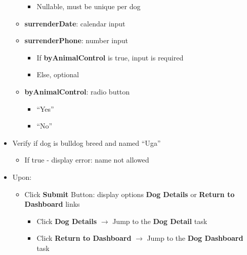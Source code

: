 \documentclass{article}
\begin{document}
\begin{itemize}
\begin{itemize}
\begin{itemize}
            \item Nullable, must be unique per dog
        \end{itemize}
        \item \textbf{surrenderDate}: calendar input
        \item \textbf{surrenderPhone}: number input
        \begin{itemize}
            \item If \textbf{byAnimalControl} is true, input is required
            \item Else, optional
        \end{itemize}
        \item \textbf{byAnimalControl}: radio button
        \begin{itemize}
            \item ``Yes''
            \item ``No''
        \end{itemize}
    \end{itemize}
    \item Verify if dog is bulldog breed and named ``Uga''
    \begin{itemize}
        \item If true - display error: name not allowed
    \end{itemize}
    \item Upon:
    \begin{itemize}
        \item Click \textbf{Submit} Button: display options \textbf{Dog Details} or \textbf{Return to Dashboard} links
        \begin{itemize}
            \item Click \textbf{Dog Details} $\rightarrow$ Jump to the \textbf{Dog Detail} task
            \item Click \textbf{Return to Dashboard} $\rightarrow$ Jump to the \textbf{Dog Dashboard} task
        \end{itemize}
    \end{itemize}
\end{itemize}
\end{document}

